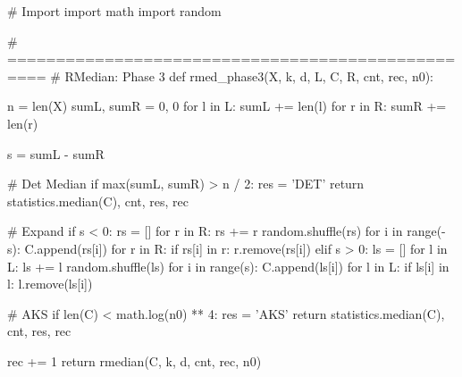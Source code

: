 \begin{python}
#   Import
import math
import random

# ==================================================
#	RMedian: Phase 3
def rmed_phase3(X, k, d, L, C, R, cnt, rec, n0):

    n = len(X)
    sumL, sumR = 0, 0
    for l in L:
        sumL += len(l)
    for r in R:
        sumR += len(r)

    s = sumL - sumR

    #   Det Median
    if max(sumL, sumR) > n / 2:
        res = 'DET'
        return statistics.median(C), cnt, res, rec

    #   Expand
    if s < 0:
        rs = []
        for r in R:
            rs += r
        random.shuffle(rs)
        for i in range(-s):
            C.append(rs[i])
            for r in R:
                if rs[i] in r:
                    r.remove(rs[i])
    elif s > 0:
        ls = []
        for l in L:
            ls += l
        random.shuffle(ls)
        for i in range(s):
            C.append(ls[i])
            for l in L:
                if ls[i] in l:
                    l.remove(ls[i])

    # AKS
    if len(C) < math.log(n0) ** 4:
        res = 'AKS'
        return statistics.median(C), cnt, res, rec

    rec += 1
    return rmedian(C, k, d, cnt, rec, n0)
\end{python}